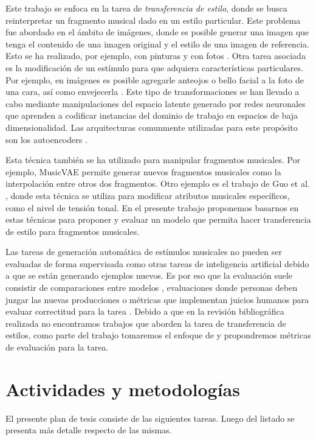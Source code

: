 \documentclass[10pt]{article}
\begin{document}
Este trabajo se enfoca en la tarea de \emph{transferencia de
estilo}, donde se busca reinterpretar un fragmento musical dado en un estilo
particular. Este problema fue abordado en el ámbito de imágenes, donde es
posible generar una imagen que tenga el contenido de una imagen original y el
estilo de una imagen de referencia. Esto se ha realizado, por ejemplo, con
pinturas \cite{gatys2015style} y con fotos \cite{luan2017photo}. Otra tarea
asociada es la modificación de un estímulo para que adquiera características
particulares. Por ejemplo, en imágenes es posible agregarle anteojos o bello
facial a la foto de una cara, así como envejecerla \cite{upchurch2016feature}.
Este tipo de transformaciones se han llevado a cabo mediante manipulaciones del
espacio latente generado por redes neuronales que aprenden a codificar
instancias del dominio de trabajo en espacios de baja dimensionalidad. Las
arquitecturas comunmente utilizadas para este propósito son los autoencoders
\cite{hou2016feature}.  

Esta técnica también se ha utilizado para manipular
fragmentos musicales. Por ejemplo, MusicVAE \cite{roberts2019musicvae} permite
generar nuevos fragmentos musicales como la interpolación entre otros dos
fragmentos. Otro ejemplo es el trabajo de Guo et al. \cite{guo2020variational},
donde esta técnica se utiliza para modificar atributos musicales específicos,
como el nivel de tensión tonal. En el presente trabajo proponemos basarnos en
estas técnicas para proponer y evaluar un modelo que permita hacer
transferencia de estilo para fragmentos musicales.

Las tareas de generación automática de estímulos musicales no pueden ser
evaluadas de forma supervisada como otras tareas de inteligencia artificial
debido a que se están generando ejemplos nuevos. Es por eso que la evaluación
suele consistir de comparaciones entre modelos \cite{Berardinis}, evaluaciones
donde personas deben juzgar las nuevas producciones \cite{hadjeres2017bach,
gatys2015style, luan2017photo} o
métricas que implementan juicios humanos para evaluar correctitud para la
tarea \cite{benetatos2020bachduet}. Debido a que en la revisión bibliográfica 
realizada no encontramos trabajos que aborden la tarea de transferencia de
estilos, como parte del trabajo tomaremos el enfoque de
\cite{benetatos2020bachduet} y propondremos métricas de evaluación para la
tarea.

\section*{Actividades y metodologías}
El presente plan de tesis consiste de las siguientes tareas. Luego del listado
se presenta más detalle respecto de las mismas.
\end{document}
